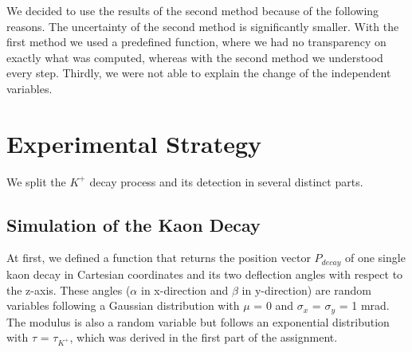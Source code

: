 \documentclass[a4paper,parskip,11pt, DIV12]{scrreprt}
\begin{document}
We decided to use the results of the second method because of the following reasons. The uncertainty of the second method is significantly smaller. With the first method we used a predefined function, where we had no transparency on exactly what was computed, whereas with the second method we understood every step. Thirdly, we were not able to explain the change of the independent variables. 

\clearpage


\chapter{Experimental Strategy}


We split the $K^+$ decay process and its detection in several distinct parts.

\section{Simulation of the Kaon Decay} \label{sec:kdecay}

At first, we defined a function that returns the position vector $P_{decay}$ of one single kaon decay in Cartesian coordinates and its two deflection angles with respect to the z-axis. These angles ($\alpha$ in x-direction and $\beta$ in y-direction) are random variables following a Gaussian distribution with $\mu$ = 0 and $\sigma_x$ = $\sigma_y$ = 1 mrad. The modulus is also a random variable but follows an exponential distribution with $\tau$ = $\tau_{K^+}$, which was derived in the first part of the assignment.
\end{document}
